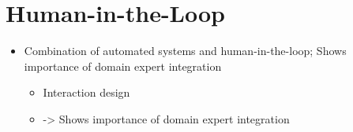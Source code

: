 \section{Human-in-the-Loop} \label{cha:intro:hitl}
\begin{itemize}
  \item Combination of automated systems and human-in-the-loop; Shows importance of domain expert integration
  \begin{itemize}
    \item Interaction design
    \item \cite{munzner2014visualization} \cite{van2005value} -> Shows importance of domain expert integration
  \end{itemize}
\end{itemize}
